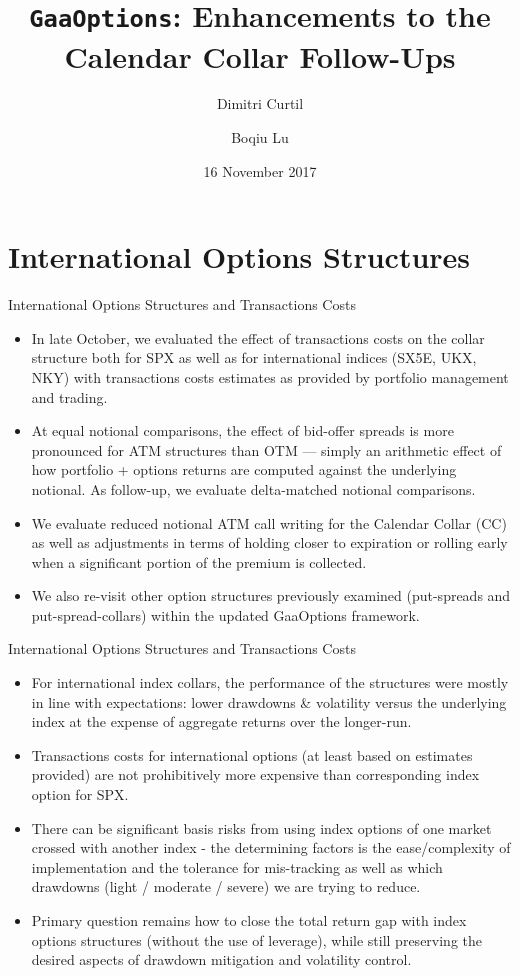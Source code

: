 \documentclass{beamer}
\title[{\tt GaaOptions}]{{\tt GaaOptions}: Enhancements to the Calendar Collar Follow-Ups}
\author[DC $|$ BL]{ Dimitri Curtil \and Boqiu Lu}
\date{16 November 2017}
\begin{document}
\begin{frame}
  \titlepage
\end{frame}

\section{International Options Structures}
\begin{frame}{International Options Structures and Transactions Costs}
\begin{itemize}

\item In late October, we evaluated the effect of transactions costs on the collar structure both for SPX as well as for international indices (SX5E, UKX, NKY) with transactions costs estimates as provided by portfolio management and trading.
\vfill
\item At equal notional comparisons, the effect of bid-offer spreads is more pronounced for ATM structures than OTM --- simply an arithmetic effect of how portfolio + options returns are computed against the underlying notional. As follow-up, we evaluate delta-matched notional comparisons.
\vfill
\item We evaluate reduced notional ATM call writing for the Calendar Collar (CC) as well as adjustments in terms of holding closer to expiration or rolling early when a significant portion of the premium is collected.
\vfill
\item We also re-visit other option structures previously examined (put-spreads and put-spread-collars) within the updated GaaOptions framework.
\vfill

\end{itemize}
\end{frame}

\begin{frame}{International Options Structures and Transactions Costs}
\begin{itemize}
\item For international index collars, the performance of the structures were mostly in line with expectations: lower drawdowns \& volatility versus the underlying index at the expense of aggregate returns over the longer-run.

\item Transactions costs for international options (at least based on estimates provided) are not prohibitively more expensive than corresponding index option for SPX.

\item There can be significant basis risks from using index options of one market crossed with another index - the determining factors is the ease/complexity of implementation and the tolerance for mis-tracking as well as which drawdowns (light / moderate / severe) we are trying to reduce.

\item Primary question remains how to close the total return gap with index options structures (without the use of leverage), while still preserving the desired aspects of drawdown mitigation and volatility control.
\end{itemize}
\end{frame}
\end{document}
